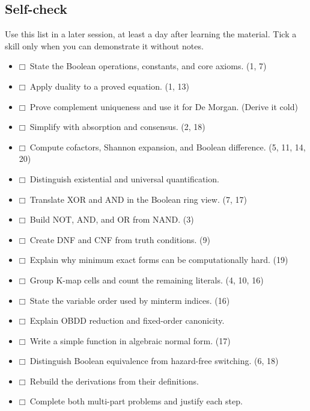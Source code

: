 \documentclass[11pt]{article}
\begin{document}
\begin{keepsection}
\section{Self-check}

Use this list in a later session, at least a day after learning the material. Tick a skill only when you can demonstrate it without notes.

\begin{itemize}
\item $\mdlgwhtsquare$\ State the Boolean operations, constants, and core axioms. (1, 7)
\item $\mdlgwhtsquare$\ Apply duality to a proved equation. (1, 13)
\item $\mdlgwhtsquare$\ Prove complement uniqueness and use it for De Morgan. (Derive it cold)
\item $\mdlgwhtsquare$\ Simplify with absorption and consensus. (2, 18)
\item $\mdlgwhtsquare$\ Compute cofactors, Shannon expansion, and Boolean difference. (5, 11, 14, 20)
\item $\mdlgwhtsquare$\ Distinguish existential and universal quantification.
\item $\mdlgwhtsquare$\ Translate XOR and AND in the Boolean ring view. (7, 17)
\item $\mdlgwhtsquare$\ Build NOT, AND, and OR from NAND. (3)
\item $\mdlgwhtsquare$\ Create DNF and CNF from truth conditions. (9)
\item $\mdlgwhtsquare$\ Explain why minimum exact forms can be computationally hard. (19)
\item $\mdlgwhtsquare$\ Group K-map cells and count the remaining literals. (4, 10, 16)
\item $\mdlgwhtsquare$\ State the variable order used by minterm indices. (16)
\item $\mdlgwhtsquare$\ Explain OBDD reduction and fixed-order canonicity.
\item $\mdlgwhtsquare$\ Write a simple function in algebraic normal form. (17)
\item $\mdlgwhtsquare$\ Distinguish Boolean equivalence from hazard-free switching. (6, 18)
\item $\mdlgwhtsquare$\ Rebuild the derivations from their definitions.
\item $\mdlgwhtsquare$\ Complete both multi-part problems and justify each step.
\end{itemize}
\end{keepsection}
\end{document}
